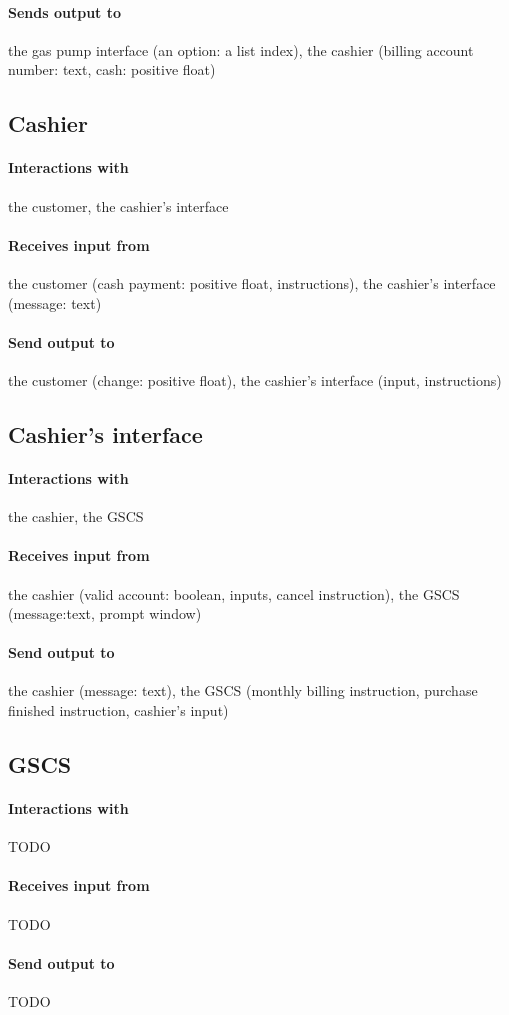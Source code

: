 \paragraph{Sends output to} the gas pump interface (an option: a list index),
the cashier (billing account number: text, cash: positive float)

\subsection{Cashier}

\paragraph{Interactions with} the customer, the cashier's interface

\paragraph{Receives input from} the customer (cash payment: positive float,
instructions), the cashier's interface (message: text)

\paragraph{Send output to} the customer (change: positive float), the cashier's
interface (input, instructions)

\subsection{Cashier's interface}

\paragraph{Interactions with} the cashier, the GSCS

\paragraph{Receives input from} the cashier (valid account: boolean, inputs,
cancel instruction), the GSCS (message:text, prompt window)

\paragraph{Send output to} the cashier (message: text), the GSCS (monthly
billing instruction, purchase finished instruction, cashier's input)

\subsection{GSCS}


\paragraph{Interactions with} TODO

\paragraph{Receives input from} TODO

\paragraph{Send output to} TODO
